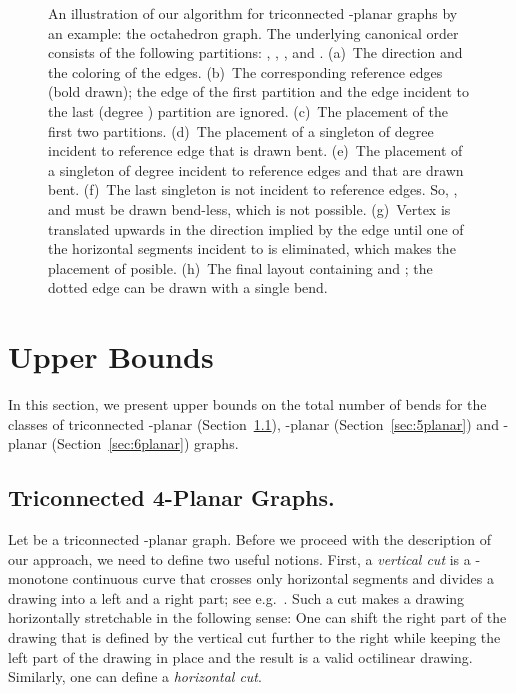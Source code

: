 \documentclass[a4paper,twoside,11pt]{article}
\begin{document}
\begin{figure}[tb]
    \caption{
    An illustration of our algorithm for triconnected -planar graphs by an example: the octahedron graph. 
    The underlying canonical order consists of the following partitions:
    , , ,  and .
    (a)~The direction and the coloring of the edges. 
    (b)~The corresponding reference edges (bold drawn); the edge  of the first partition and the edge  incident to the last (degree ) partition are ignored. 
    (c)~The placement of the first two partitions.
    (d)~The placement of a singleton of degree  incident to reference edge  that is drawn bent.
    (e)~The placement of a singleton of degree  incident to reference edges  and  that are drawn bent.
    (f)~The last singleton  is not incident to reference edges. So, ,  and  must be drawn bend-less, which is not possible.
    (g)~Vertex  is translated upwards in the direction implied by the edge  until one of the horizontal segments incident to  is eliminated, which makes the placement of  posible.
    (h)~The final layout containing  and ; the dotted edge can be drawn with a single bend.}
    \label{fig:4p_example} 
\end{figure} 

\section{Upper Bounds}
\label{sec:upperbounds}


In this section, we present upper bounds on the total number of
bends for the classes of triconnected -planar
(Section~\ref{sec:4planar}), -planar (Section~\ref{sec:5planar})
and -planar (Section~\ref{sec:6planar}) graphs.

\subsection{Triconnected 4-Planar Graphs.}
\label{sec:4planar}


Let  be a triconnected -planar graph. Before we proceed
with the description of our approach, we need to define two useful
notions. First, a \emph{vertical cut} is a -monotone continuous
curve that crosses only horizontal segments and divides a drawing
into a left and a right part; see e.g.~\cite{FCK98}. Such a cut
makes a drawing horizontally stretchable in the following sense: One
can shift the right part of the drawing that is defined by the
vertical cut further to the right while keeping the left part of
the drawing in place and the result is a valid octilinear drawing.
Similarly, one can define a \emph{horizontal cut}. 
\end{document}
